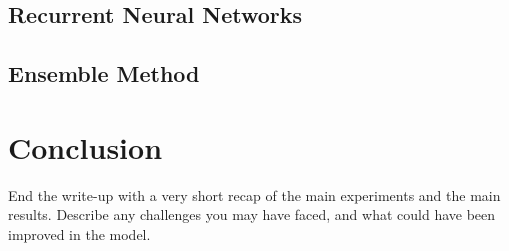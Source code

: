 \documentclass[11pt]{article}
\begin{document}
\subsection{Recurrent Neural Networks}

\subsection{Ensemble Method}


\section{Conclusion}

End the write-up with a very short recap of the main experiments and the main results. Describe any challenges you may have faced, and what could have been improved in the model.



\end{document}
